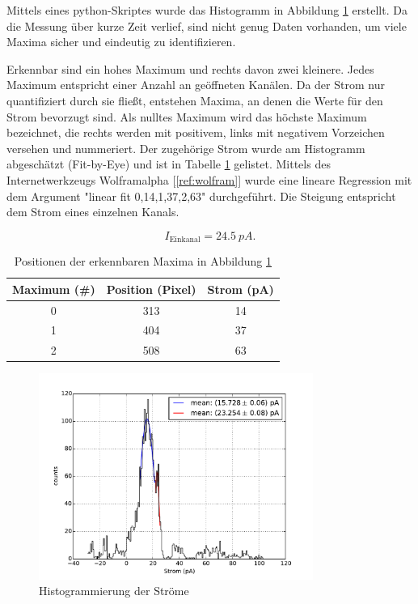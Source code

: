 \documentclass[a4paper,ngerman]{scrartcl}
\begin{document}
Mittels eines python-Skriptes wurde das Histogramm in Abbildung \ref{fig:mehrkanal-histo} erstellt. Da die Messung über kurze Zeit verlief, sind nicht genug Daten vorhanden, um viele Maxima sicher und eindeutig zu identifizieren. 

Erkennbar sind ein hohes Maximum und rechts davon zwei kleinere. 
Jedes Maximum entspricht einer Anzahl an geöffneten Kanälen. Da der Strom nur quantifiziert durch sie fließt, entstehen Maxima, an denen die Werte für den Strom bevorzugt sind.
Als nulltes Maximum wird das höchste Maximum bezeichnet, die rechts werden mit positivem, links mit negativem Vorzeichen versehen und nummeriert. 
Der zugehörige Strom wurde am Histogramm abgeschätzt (Fit-by-Eye) und ist in Tabelle \ref{tab:mehrkanal-maxima} gelistet. Mittels des Internetwerkzeugs Wolframalpha [\ref{ref:wolfram}] wurde eine lineare Regression mit dem Argument "linear fit {0,14},{1,37},{2,63}" durchgeführt. Die Steigung entspricht dem Strom eines einzelnen Kanals. 

\begin{equation}
\label{eqn:I_ch_aus_hist}
I_{\text{Einkanal}} = \SI{24.5}{pA} .
\end{equation}


\begin{table}
\centering
\caption{Positionen der erkennbaren Maxima in Abbildung \ref{fig:mehrkanal-histo}}
\label{tab:mehrkanal-maxima}
\begin{tabular}{ccc}
Maximum (\#)	&	Position (Pixel)	&	Strom (pA) \\
\hline
0	&	313	&	14	\\
1	&	404	&	37	\\
2	&	508	&	63	\\
\end{tabular}
\end{table}

\begin{figure}[tbh!]
\includegraphics[width=0.8\textwidth]{abbildungen/mehrkanal_histo.pdf}
\caption{Histogrammierung der Ströme}
\label{fig:mehrkanal-histo}
\end{figure}
\end{document}
